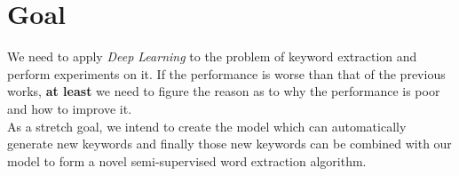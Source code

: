 \documentclass[dvips,12pt]{article}
\begin{document}
	\section{Goal}
	We need to apply \emph{Deep Learning} to the problem of keyword extraction and perform experiments on it. If the performance is worse than that of the previous works, \textbf{at least} we need to figure the reason as to why the performance is poor and how to improve it. \\
	As a stretch goal, we intend to create the model which can automatically generate new keywords and finally those new keywords can be combined with our model to form a novel semi-supervised word extraction algorithm.
	
	
	
	
	
	
	
	
	
	
	
	
	
	
	
	
\end{document}

